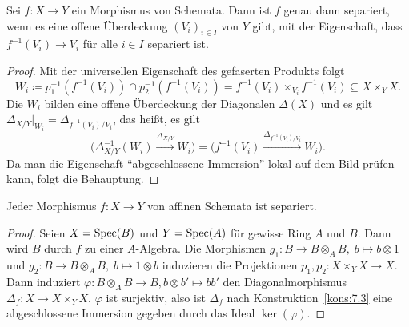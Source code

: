 \begin{lem}
\label{lem:10.2}
	Sei $f \colon X \to Y$ ein Morphismus von Schemata. Dann ist $f$ genau dann separiert, wenn es eine offene Überdeckung $(V_i)_{i\in I}$ von $Y$ gibt, mit der Eigenschaft, dass $f^{-1}(V_i) \to V_i$ für alle $i \in I$ separiert ist.
	\begin{proof}
		Mit der universellen Eigenschaft des gefaserten Produkts folgt
		\[
			W_i \coloneqq p_1^{-1}(f^{-1}(V_i)) \cap p_2^{-1}(f^{-1}(V_i)) = f^{-1}(V_i) \times_{V_i} f^{-1}(V_i) \subseteq X \times_Y X.
		\]
		Die $W_i$ bilden eine offene Überdeckung der Diagonalen $\Delta(X)$ und es gilt $\Delta_{X/Y}\vert_{W_i} = \Delta_{f^{-1}(V_i)/V_i}$, das heißt, es gilt
		\[
			\Bigg(\Delta^{-1}_{X/Y}(W_i) \xrightarrow{\Delta_{X/Y}} W_i\Bigg) = \Bigg(f^{-1}(V_i) \xrightarrow{\Delta_{f^{-1}(V_i)/V_i}} W_i\Bigg).
		\]
		Da man die Eigenschaft \enquote{abgeschlossene Immersion} lokal auf dem Bild prüfen kann, folgt die Behauptung. 
	\end{proof}
\end{lem}

\pagebreak[2]
\begin{prop}
\label{prop:10.3}
	Jeder Morphismus $f\colon X \to Y$ von affinen Schemata ist separiert.
	\begin{proof}
		Seien $X=\operatorname{Spec}(B)$ und $Y=\operatorname{Spec}(A)$ für gewisse Ring $A$ und $B$. Dann wird $B$ durch $f$ zu einer $A$-Algebra. Die Morphismen $g_1\colon B \to B \otimes_A B,\; b \mapsto b \otimes 1$ und $g_2\colon B \to B \otimes_A B,\; b \mapsto 1 \otimes b$ induzieren die Projektionen $p_1,p_2 \colon X\times_Y X\to X$. Dann induziert $\varphi\colon B\otimes_A B \to B, b \otimes b' \mapsto bb'$ den Diagonalmorphismus $\Delta_f\colon X \to X \times_Y X$. $\varphi$ ist surjektiv, also ist $\Delta_f$ nach Konstruktion~\ref{kons:7.3} eine abgeschlossene Immersion gegeben durch das Ideal $\ker(\varphi)$.
	\end{proof}
\end{prop}

